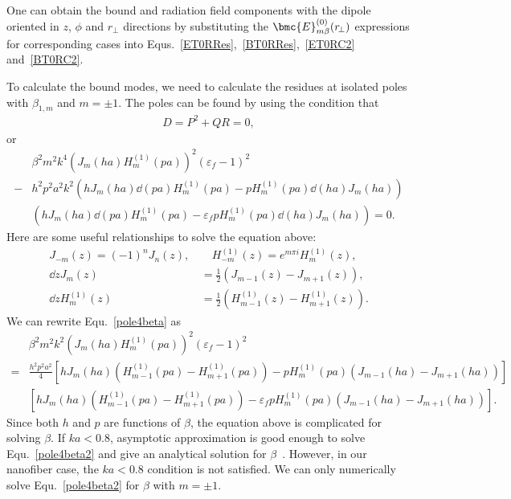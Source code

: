 \documentclass[]{report}
\begin{document}
One can obtain the bound and radiation field components with the dipole oriented in $ z $, $ \phi $ and $ r\!_\perp $ directions by substituting the $ \bmc{E}^{(0)}_{m\beta}(r\!_\perp) $ expressions for corresponding cases into Equs.~\ref{ET0RRes},~\ref{BT0RRes},~\ref{ET0RC2} and~\ref{BT0RC2}. 

To calculate the bound modes, we need to calculate the residues at isolated poles with $ \beta_{1,m} $ and $ m=\pm 1 $. The poles can be found by using the condition that
\begin{align}
D=P^2+QR=0,
\end{align}
or
\begin{align}\label{pole4beta}
&\beta^2m^2k^4\left(J_m(ha) H_m^{(1)}(pa) \right)^2 (\varepsilon_f-1)^2\nonumber\\
-& h^2p^2a^2k^2 \left(hJ_m(ha) \dd{}{(pa)}H_m^{(1)}(pa)-pH_m^{(1)}(pa)\dd{}{(ha)}J_m(ha) \right)\nonumber\\ &\left(hJ_m(ha) \dd{}{(pa)}H_m^{(1)}(pa)-\varepsilon_f pH_m^{(1)}(pa)\dd{}{(ha)}J_m(ha) \right)=0.
\end{align}
Here are some useful relationships to solve the equation above:
\begin{align}
J_{-m}(z)=(-1)^nJ_n(z),\, &\quad H_{-m}^{(1)}(z)=e^{m\pi i}H_m^{(1)}(z),\\
\dd{}{z}J_m(z) &= \frac{1}{2} \left( J_{m-1}(z)-J_{m+1}(z) \right),\\ 
\dd{}{z}H^{(1)}_m(z) &= \frac{1}{2} \left( H^{(1)}_{m-1}(z)-H^{(1)}_{m+1}(z) \right).
\end{align}
We can rewrite Equ.~\ref{pole4beta} as
\begin{align}\label{pole4beta2}
&\beta^2m^2k^2\left(J_m\!(ha) H_m^{(\!1\!)}\!(pa) \right)^2 (\varepsilon_f-1)^2\nonumber\\
=& \frac{h^2p^2a^2}{4} \left[hJ_m\!(ha)\! \left( H^{(\!1\!)}_{m-1}\!(pa)\!-\! H^{(\!1\!)}_{m+1}\!(pa) \right)\!-\! pH_m^{(\!1\!)}\!(pa)\left( J_{m-1}\!(ha)\!-\! J_{m+1}\!(ha) \right) \right]\nonumber\\ 
&\left[hJ_m\!(ha) \left( H^{(\!1\!)}_{m-1}\!(pa)\!-\! H^{(\!1\!)}_{m+1}\!(pa) \right)\!-\! \varepsilon_f pH_m^{(\!1\!)}\!(pa)\left( J_{m-1}\!(ha)\!-\! J_{m+1}\!(ha) \right) \right].
\end{align}
Since both $ h $ and $ p $ are functions of $ \beta $, the equation above is complicated for solving $ \beta $. If $ ka<0.8 $, asymptotic approximation is good enough to solve Equ.~\ref{pole4beta2} and give an analytical solution for $ \beta $~\cite{Klimov2004}. However, in our nanofiber case, the $ ka<0.8 $ condition is not satisfied. We can only numerically solve Equ.~\ref{pole4beta2} for $ \beta $ with $ m=\pm 1 $. 
\end{document}
